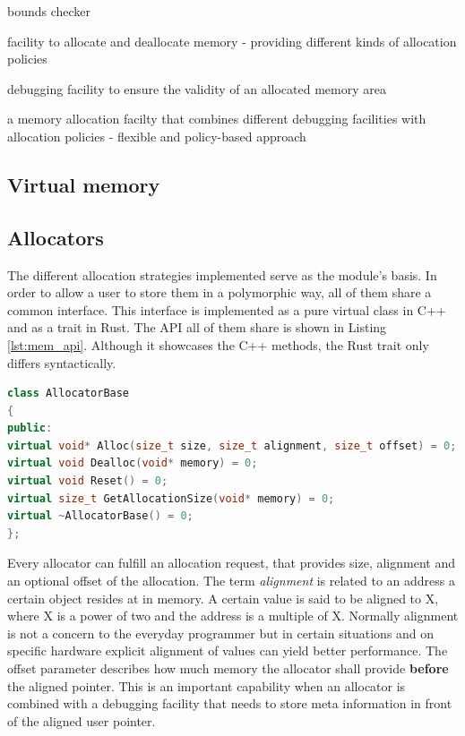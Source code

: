 \begin{labeling}{bounds checker}
	\item [allocator] facility to allocate and deallocate memory - providing different kinds of allocation policies
	\item [bounds checker] debugging facility to ensure the validity of an allocated memory area
	\item [memory realm] a memory allocation facilty that combines different 
	debugging facilities with allocation policies - flexible and policy-based approach
\end{labeling}

\subsection{Virtual memory}
\blindtext

\subsection{Allocators}

The different allocation strategies implemented serve as the module's basis. In order to allow a user to store them in a polymorphic way, all of them share a common interface. This interface is implemented as a pure virtual class in C++ and as a trait in Rust. The \ac{API} all of them share is shown in Listing \ref{lst:mem_api}. Although it showcases the C++ methods, the Rust trait only differs syntactically.\\

\begin{lstlisting}[caption={Common interface among all allocator implementation. Rust trait only differs syntactically from this C++ sample.}, label={lst:mem_api}, language={C++}]
class AllocatorBase
{
public:
virtual void* Alloc(size_t size, size_t alignment, size_t offset) = 0;
virtual void Dealloc(void* memory) = 0;
virtual void Reset() = 0;
virtual size_t GetAllocationSize(void* memory) = 0;
virtual ~AllocatorBase() = 0;
};
\end{lstlisting}

\noindent
Every allocator can fulfill an allocation request, that provides size, alignment and an optional offset of the allocation.  The term \textit{alignment} is related to an address a certain object resides at in memory. A certain value is said to be aligned to X, where X is a power of two and the address is a multiple of X. Normally alignment is not a concern to the everyday programmer but in certain situations and on specific hardware explicit alignment of values can yield better performance. The offset parameter describes how much memory the allocator shall provide \textbf{before} the aligned pointer. This is an important capability when an allocator is combined with a debugging facility that needs to store meta information in front of the aligned user pointer. 

